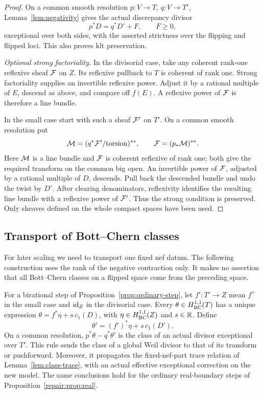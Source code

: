 \begin{proof}
On a common smooth resolution $p:V\to T$, $q:V\to T'$,
Lemma~\ref{lem:negativity} gives the actual discrepancy divisor
\begin{equation}\label{eq:ordinary-small-difference}
 p^*D=q^*D'+F,\qquad F\geq0,
\end{equation}
exceptional over both sides, with the asserted strictness over the
flipping and flipped loci.  This also proves klt preservation.

\smallskip\noindent
\emph{Optional strong factoriality.}
In the divisorial case, take any coherent rank-one reflexive sheaf
$\mathcal F$ on $Z$.  Its reflexive pullback to $T$ is coherent of rank one.
Strong factoriality supplies an invertible reflexive power.  Adjust it
by a rational multiple of $E$, descend as above, and compare off $f(E)$.
A reflexive power of $\mathcal F$ is therefore a line bundle.

In the small case start with such a sheaf $\mathcal F'$ on $T'$.  On a common
smooth resolution put
\[
 \mathcal M=(q^*\mathcal F'/\text{torsion})^{**},\qquad
 \mathcal F=(p_*\mathcal M)^{**}.
\]
Here $\mathcal M$ is a line bundle and $\mathcal F$ is coherent reflexive of rank one;
both give the required transform on the common big open.  An invertible
power of $\mathcal F$, adjusted by a rational multiple of $D$, descends.
Pull back the descended bundle and undo the twist by $D'$.  After
clearing denominators, reflexivity identifies the resulting line bundle
with a reflexive power of $\mathcal F'$.  Thus the strong condition is
preserved.  Only sheaves defined on the whole compact spaces have been
used.

\end{proof}

\subsection{Transport of Bott--Chern classes}

For later scaling we need to transport one fixed nef datum.  The following
construction uses the rank of the negative contraction only.  It makes
no assertion that all Bott--Chern classes on a flipped space come from
the preceding space.

\begin{lemma}\label{lem:class-transport}
For a birational step of Proposition~\ref{prop:ordinary-step}, let
$f':T'\to Z$ mean $f^+$ in the small case and $\mathrm{id}_Z$ in the divisorial
case.  Every $\theta\in H^{1,1}_{\mathrm{BC}}(T)$ has a unique expression
$\theta=f^*\eta+s\,c_1(D)$, with $\eta\in H^{1,1}_{\mathrm{BC}}(Z)$ and $s\in\mathbb R$.
Define
\begin{equation}\label{eq:class-transport}
 \theta'= (f')^*\eta+s\,c_1(D').
\end{equation}
On a common resolution, $p^*\theta-q^*\theta'$ is the class of an
actual divisor exceptional over $T'$.  This rule sends the class of a
global Weil divisor to that of its transform or pushforward.  Moreover,
it propagates the fixed-nef-part trace relation of
Lemma~\ref{lem:class-trace}, with an actual effective exceptional
correction on the new model.  The same conclusions hold for the ordinary
real-boundary steps of Proposition~\ref{repair:prop:real}.
\end{lemma}

